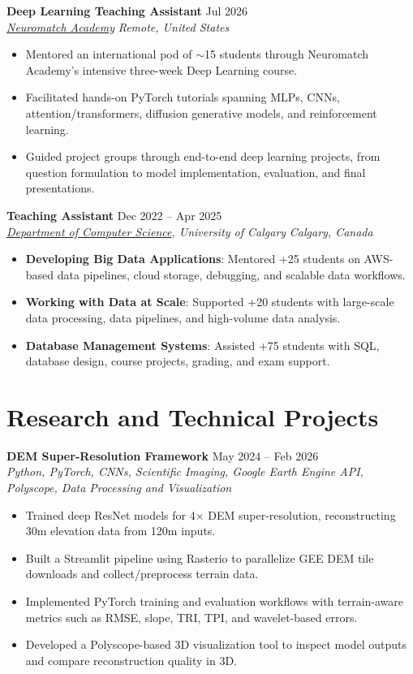 \documentclass[a4paper,10pt]{article}
\newcommand{\resumeSubheading}[4]{
    \textbf{#1} \hfill #2 \\
    \textit{#3} \hfill \textit{#4}
}
\begin{document}
\resumeSubheading
{Deep Learning Teaching Assistant}
{Jul 2026}
{\href{https://neuromatch.io/}{Neuromatch Academy}}
{Remote, United States}
\begin{itemize}[leftmargin=0.25in]
    \item Mentored an international pod of $\sim$15 students through Neuromatch Academy's intensive three-week Deep Learning course.
    \item Facilitated hands-on PyTorch tutorials spanning MLPs, CNNs, attention/transformers, diffusion generative models, and reinforcement learning.
    \item Guided project groups through end-to-end deep learning projects, from question formulation to model implementation, evaluation, and final presentations.
\end{itemize}

\resumeSubheading
{Teaching Assistant}
{Dec 2022 -- Apr 2025}
{\href{https://science.ucalgary.ca/computer-science} {Department of Computer Science}, University of Calgary}
{Calgary, Canada}
\begin{itemize}[leftmargin=0.25in]
    \item \textbf{Developing Big Data Applications}: Mentored +25 students on AWS-based data pipelines, cloud storage, debugging, and scalable data workflows. 
    \item \textbf{Working with Data at Scale}: Supported +20 students with large-scale data processing, data pipelines, and high-volume data analysis. 
    \item \textbf{Database Management Systems}: Assisted +75 students with SQL, database design, course projects, grading, and exam support.
\end{itemize}


\section*{Research and Technical Projects}

\noindent
\textbf{DEM Super-Resolution Framework} \hfill May 2024 -- Feb 2026 \\
\textit{Python, PyTorch, CNNs, Scientific Imaging, Google Earth Engine API, Polyscope, Data Processing and Visualization}
\begin{itemize}[leftmargin=0.25in]
    \item Trained deep ResNet models for 4$\times$ DEM super-resolution, reconstructing 30m elevation data from 120m inputs.
    \item Built a Streamlit pipeline using Rasterio to parallelize GEE DEM tile downloads and collect/preprocess terrain data.
    \item Implemented PyTorch training and evaluation workflows with terrain-aware metrics such as RMSE, slope, TRI, TPI, and wavelet-based errors.
    \item Developed a Polyscope-based 3D visualization tool to inspect model outputs and compare reconstruction quality in 3D.
\end{itemize}
\end{document}
